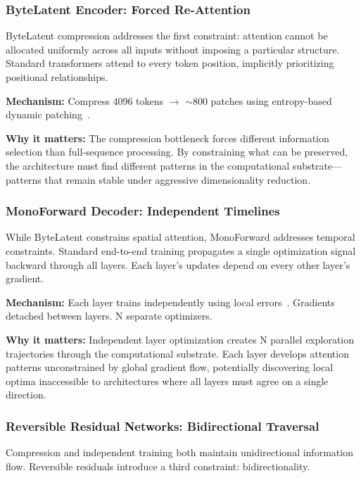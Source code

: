 \documentclass{article}
\begin{document}
\subsubsection{ByteLatent Encoder: Forced Re-Attention}

ByteLatent compression addresses the first constraint: attention cannot be allocated uniformly across all inputs without imposing a particular structure. Standard transformers attend to every token position, implicitly prioritizing positional relationships.

\textbf{Mechanism:} Compress 4096 tokens $\rightarrow$ $\sim$800 patches using entropy-based dynamic patching~\cite{pagnoni2024byte}.

\textbf{Why it matters:} The compression bottleneck forces different information selection than full-sequence processing. By constraining what can be preserved, the architecture must find different patterns in the computational substrate—patterns that remain stable under aggressive dimensionality reduction.

\subsubsection{MonoForward Decoder: Independent Timelines}

While ByteLatent constrains spatial attention, MonoForward addresses temporal constraints. Standard end-to-end training propagates a single optimization signal backward through all layers. Each layer's updates depend on every other layer's gradient.

\textbf{Mechanism:} Each layer trains independently using local errors~\cite{monoforward2025}. Gradients detached between layers. N separate optimizers.

\textbf{Why it matters:} Independent layer optimization creates N parallel exploration trajectories through the computational substrate. Each layer develops attention patterns unconstrained by global gradient flow, potentially discovering local optima inaccessible to architectures where all layers must agree on a single direction.

\subsubsection{Reversible Residual Networks: Bidirectional Traversal}

Compression and independent training both maintain unidirectional information flow. Reversible residuals introduce a third constraint: bidirectionality.
\end{document}
